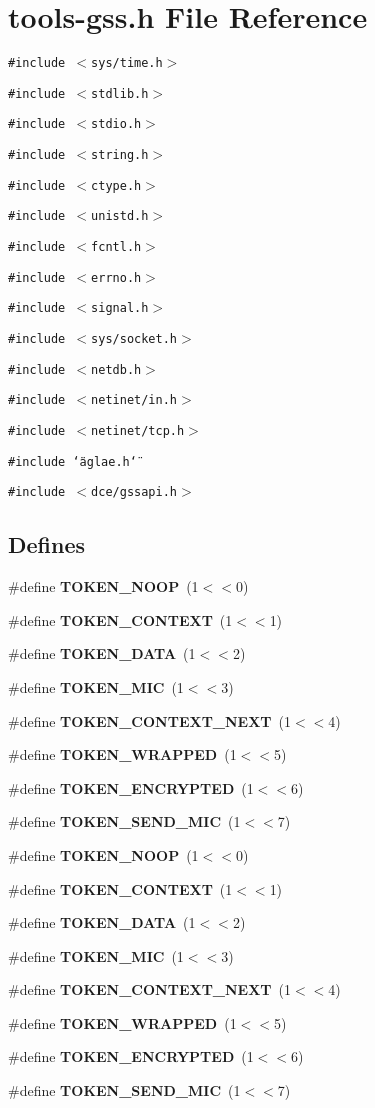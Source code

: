 \section{tools-gss.h File Reference}
\label{tools-gss_8h}
{\tt \#include $<$sys/time.h$>$}\par
{\tt \#include $<$stdlib.h$>$}\par
{\tt \#include $<$stdio.h$>$}\par
{\tt \#include $<$string.h$>$}\par
{\tt \#include $<$ctype.h$>$}\par
{\tt \#include $<$unistd.h$>$}\par
{\tt \#include $<$fcntl.h$>$}\par
{\tt \#include $<$errno.h$>$}\par
{\tt \#include $<$signal.h$>$}\par
{\tt \#include $<$sys/socket.h$>$}\par
{\tt \#include $<$netdb.h$>$}\par
{\tt \#include $<$netinet/in.h$>$}\par
{\tt \#include $<$netinet/tcp.h$>$}\par
{\tt \#include \char`\"{}aglae.h\char`\"{}}\par
{\tt \#include $<$dce/gssapi.h$>$}\par
\subsection*{Defines}
\begin{CompactItemize}
\item 
\#define {\bf TOKEN\_\-NOOP}\ (1$<$$<$0)
\item 
\#define {\bf TOKEN\_\-CONTEXT}\ (1$<$$<$1)
\item 
\#define {\bf TOKEN\_\-DATA}\ (1$<$$<$2)
\item 
\#define {\bf TOKEN\_\-MIC}\ (1$<$$<$3)
\item 
\#define {\bf TOKEN\_\-CONTEXT\_\-NEXT}\ (1$<$$<$4)
\item 
\#define {\bf TOKEN\_\-WRAPPED}\ (1$<$$<$5)
\item 
\#define {\bf TOKEN\_\-ENCRYPTED}\ (1$<$$<$6)
\item 
\#define {\bf TOKEN\_\-SEND\_\-MIC}\ (1$<$$<$7)
\item 
\#define {\bf TOKEN\_\-NOOP}\ (1$<$$<$0)
\item 
\#define {\bf TOKEN\_\-CONTEXT}\ (1$<$$<$1)
\item 
\#define {\bf TOKEN\_\-DATA}\ (1$<$$<$2)
\item 
\#define {\bf TOKEN\_\-MIC}\ (1$<$$<$3)
\item 
\#define {\bf TOKEN\_\-CONTEXT\_\-NEXT}\ (1$<$$<$4)
\item 
\#define {\bf TOKEN\_\-WRAPPED}\ (1$<$$<$5)
\item 
\#define {\bf TOKEN\_\-ENCRYPTED}\ (1$<$$<$6)
\item 
\#define {\bf TOKEN\_\-SEND\_\-MIC}\ (1$<$$<$7)
\end{CompactItemize}
